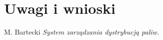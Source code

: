 \documentclass[11pt,a4paper,oneside]{mwart}
\begin{document}
\section{Uwagi i wnioski}



 
 \newpage
 \listoftables
 \listofwykress
 \listofschems

 \begin{thebibliography}{12}
    M. Bartecki \emph{System zarządzania dystrybucją paliw.} 
 \end{thebibliography}
\end{document}
